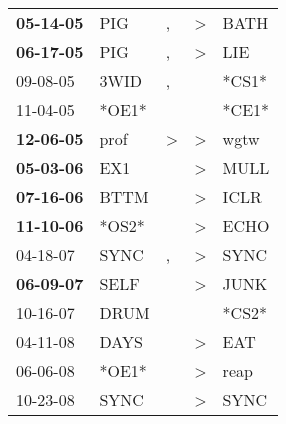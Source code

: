 \begin{supertabular}{p{0.07\textwidth}p{0.06\textwidth}p{0.02\textwidth}p{0.02\textwidth}p{0.06\textwidth}}
 \textbf{05-14-05\textsuperscript{}} &            PIG\textsuperscript{} &                , &     \textgreater &           BATH\textsuperscript{} \\
 \textbf{06-17-05\textsuperscript{}} &            PIG\textsuperscript{} &                , &     \textgreater &            LIE\textsuperscript{} \\
          09-08-05\textsuperscript{} &           3WID\textsuperscript{} &                , &                  &                            *CS1* \\
          11-04-05\textsuperscript{} &                            *OE1* &                  &                  &                            *CE1* \\
 \textbf{12-06-05\textsuperscript{}} &           prof\textsuperscript{} &     \textgreater &     \textgreater &           wgtw\textsuperscript{} \\
 \textbf{05-03-06\textsuperscript{}} &            EX1\textsuperscript{} &                  &     \textgreater &           MULL\textsuperscript{} \\
 \textbf{07-16-06\textsuperscript{}} &           BTTM\textsuperscript{} &                  &     \textgreater &           ICLR\textsuperscript{} \\
 \textbf{11-10-06\textsuperscript{}} &                            *OS2* &                  &     \textgreater &           ECHO\textsuperscript{} \\
          04-18-07\textsuperscript{} &           SYNC\textsuperscript{} &                , &     \textgreater &           SYNC\textsuperscript{} \\
 \textbf{06-09-07\textsuperscript{}} &           SELF\textsuperscript{} &                  &     \textgreater &           JUNK\textsuperscript{} \\
          10-16-07\textsuperscript{} &           DRUM\textsuperscript{} &                  &                  &                            *CS2* \\
          04-11-08\textsuperscript{} &           DAYS\textsuperscript{} &                  &     \textgreater &            EAT\textsuperscript{} \\
          06-06-08\textsuperscript{} &                            *OE1* &                  &     \textgreater &           reap\textsuperscript{} \\
          10-23-08\textsuperscript{} &           SYNC\textsuperscript{} &                  &     \textgreater &           SYNC\textsuperscript{} \\

\end{supertabular}
